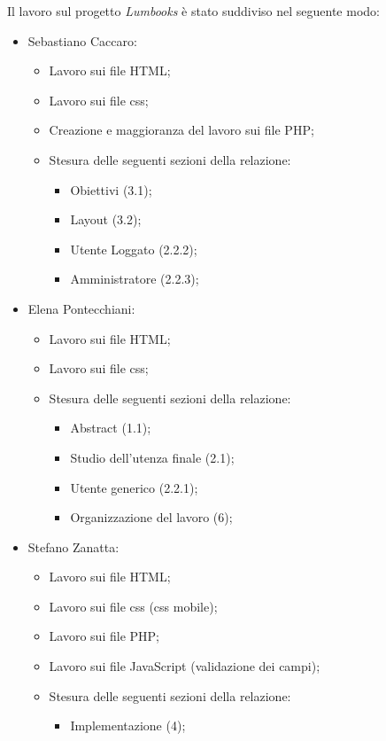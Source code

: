 Il lavoro sul progetto \textit{Lumbooks} è stato suddiviso nel seguente modo:
\begin{itemize}
	\item Sebastiano Caccaro:
	\begin{itemize}
		\item Lavoro sui file HTML;
		\item Lavoro sui file css;
		\item Creazione e maggioranza del lavoro sui file PHP;
		\item Stesura delle seguenti sezioni della relazione:
			\begin{itemize}
				\item Obiettivi (3.1);
				\item Layout (3.2);
				\item Utente Loggato (2.2.2);
				\item Amministratore (2.2.3);	
			\end{itemize}
	\end{itemize}
	

	\item Elena Pontecchiani:
	\begin{itemize}
		\item Lavoro sui file HTML;
		\item Lavoro sui file css;
		\item Stesura delle seguenti sezioni della relazione:
			\begin{itemize}
				\item Abstract (1.1);
				\item Studio dell'utenza finale (2.1);
				\item Utente generico (2.2.1);	
				\item Organizzazione del lavoro (6);
			\end{itemize}
	\end{itemize}
	

	\item Stefano Zanatta:
	\begin{itemize}
		\item Lavoro sui file HTML;
		\item Lavoro sui file css (css mobile);
		\item Lavoro sui file PHP;
		\item Lavoro sui file JavaScript (validazione dei campi);
		\item Stesura delle seguenti sezioni della relazione:
			\begin{itemize}
				\item Implementazione (4);
			\end{itemize}
	\end{itemize}
	


\end{itemize}
